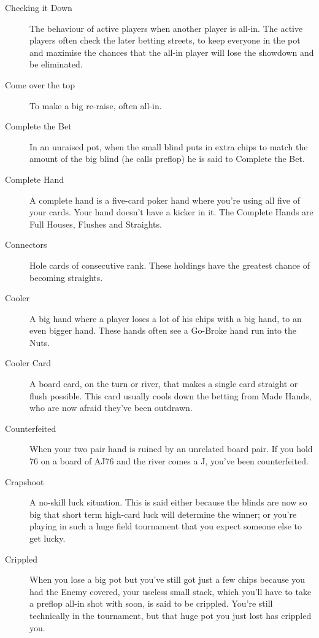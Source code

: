 \begin{description}
\item[Checking it Down] The behaviour of active players when another
player is all-in. The active players often check the later betting
streets, to keep everyone in the pot and maximise the chances that the
all-in player will lose the showdown and be eliminated.

\item[Come over the top] To make a big re-raise, often all-in.

\item[Complete the Bet] In an unraised pot, when the small blind puts
in extra chips to match the amount of the big blind (he calls preflop)
he is said to Complete the Bet.

\item[Complete Hand] A complete hand is a five-card poker hand where
you're using all five of your cards. Your hand doesn't have a kicker
in it. The Complete Hands are Full Houses, Flushes and Straights.

\item[Connectors] Hole cards of consecutive rank. These holdings have
the greatest chance of becoming straights.

\item[Cooler] A big hand where a player loses a lot of his chips with
a big hand, to an even bigger hand. These hands often see a Go-Broke
hand run into the Nuts.

\item[Cooler Card] A board card, on the turn or river, that makes a
single card straight or flush possible. This card usually cools down
the betting from Made Hands, who are now afraid they've been outdrawn.

\item[Counterfeited] When your two pair hand is ruined by an unrelated
board pair. If you hold 76 on a board of AJ76 and the river comes a J,
you've been counterfeited.

\item[Crapshoot] A no-skill luck situation. This is said either
because the blinds are now so big that short term high-card luck will
determine the winner; or you're playing in such a huge field
tournament that you expect someone else to get lucky.

\item[Crippled] When you lose a big pot but you've still got just a
few chips because you had the Enemy covered, your useless small stack,
which you'll have to take a preflop all-in shot with soon, is said to
be crippled. You're still technically in the tournament, but that huge
pot you just lost has crippled you.


\end{description}
